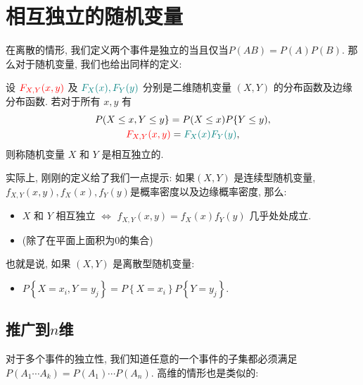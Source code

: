 \section{相互独立的随机变量}

在离散的情形, 我们定义两个事件是独立的当且仅当$P(AB)=P(A)P(B)$. 那么对于随机变量, 我们也给出同样的定义: 

\begin{definition}[相互独立的随机变量]
    设 ${{\color{red}F_{X,Y}(x, y)}}$ 及 ${{\color{teal}F_X(x), F_Y(y)}}$ 分别是二维随机变量 $(X, Y)$ 的分布函数及边缘分布函数. 若对于所有 $x, y$ 有
    $$
\begin{gathered}
    P(X \leq x, Y \leq y\}=P(X \leq x) P\{Y \leq y), \\
{{\color{red}F_{X,Y}(x, y)}}={{\color{teal}F_X(x) F_Y(y)}},
\end{gathered}
$$
则称随机变量 $X$ 和 $Y$ 是相互独立的.
\end{definition}

实际上, 刚刚的定义给了我们一点提示: 如果$(X, Y)$ 是连续型随机变量,$f_{X,Y}(x, y), f_X(x), f_Y(y)$是概率密度以及边缘概率密度, 那么: 
\begin{itemize}
    \item $X$ 和 $Y$ 相互独立 $\iff$ $f_{X,Y}(x, y)=f_X(x) f_Y(y)$ 几乎处处成立. 
    \item (除了在平面上面积为0的集合)
\end{itemize}

也就是说, 如果 $(X, Y)$ 是离散型随机变量:
    \begin{itemize}
        \item $P\left\{X=x_i, Y=y_j\right\}=P\left\{X=x_i\right\} P\left\{Y=y_j\right\}$.
    \end{itemize}

\subsection{推广到$n$维}

对于多个事件的独立性, 我们知道任意的一个事件的子集都必须满足$P(A_1\cdots A_k)=P(A_1)\cdots P(A_n)$. 高维的情形也是类似的: 

